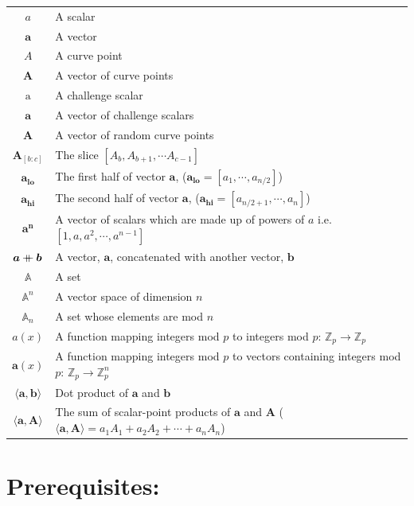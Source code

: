 \documentclass{article}
\renewcommand{\vec}[1]{\boldsymbol{#1}}
\newcommand{\ran}[1]{\mathrm{#1}}
\newcommand{\vecran}[1]{\mathbf{#1}}
\newcommand{\Z}{\mathbb{Z}}
\newcommand\concat{\mathbin{+\mkern-10mu+}} %
\newcommand{\dotp}[2]{\langle #1, #2 \rangle}
\newcommand{\opn}[1]{\operatorname{#1}}
\newcommand{\veclo}[1]{\vec{#1_{\opn{lo}}}}
\newcommand{\vechi}[1]{\vec{#1_{\opn{hi}}}}
\begin{document}
\begin{center}
\begin{tabular}{ c l }
	$a$                         & A scalar \\
	$\vec{a}$                   & A vector \\
	$A$                         & A curve point \\
	$\vec{A}$                   & A vector of curve points \\
	$\ran{a}$                   & A challenge scalar \\
	$\vecran{a}$                & A vector of challenge scalars \\
	$\vecran{A}$                & A vector of random curve points \\
	$\vec{A}_{[b : c]}$            & The slice $[A_b, A_{b+1}, \cdots  A_{c-1}]$ \\ 
	$\veclo{a}$                 & The first half of vector $\vec{a}$, ($\veclo{a} = [a_{1}, \cdots, a_{n/2}]$) \\
	$\vechi{a}$                 & The second half of vector $\vec{a}$, ($\vechi{a} = [a_{n/2+1}, \cdots, a_{n}]$) \\
	$\vec{a^n}$                 & A vector of scalars which are made up of powers of $a$ i.e. $[1,a,a^2, \cdots, a^{n-1}]$\\
	$\vec{a} \concat \vec{b}$   & A vector, $\vec{a}$, concatenated with another vector, $\vec{b}$\\
	$\mathbb{A}$                & A set \\
	$\mathbb{A}^n$              & A vector space of dimension $n$ \\ 
	$\mathbb{A}_n$              & A set whose elements are mod $n$ \\ 
	$a(x)$                      & A function mapping integers mod $p$ to integers mod $p$: $\Z_p \rightarrow \Z_p$ \\
	$\vec{a}(x)$                & A function mapping integers mod $p$ to vectors containing integers mod $p$: $\Z_p \rightarrow \Z^n_p$ \\
	$\dotp{\vec{a}}{\vec{b}}$   & Dot product of $\vec{a}$ and $\vec{b}$ \\
	$\dotp{\vec{a}}{\vec{A}}$   & The sum of scalar-point products of $\vec{a}$ and $\vec{A}$ ($\dotp{\vec{a}}{\vec{A}} = a_1 A_1 + a_2 A_2 + \cdots + a_n A_n$) \\
\end{tabular}
\end{center}

\section{Prerequisites:} \label{prerequisites}
\end{document}
